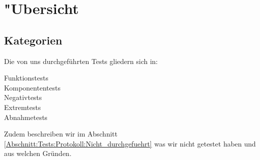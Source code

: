 %



\section{{"U}bersicht}
\label{Abschnitt:Tests:Uebersicht}

\subsection{Kategorien}
\label{Abschnitt:Tests:Uebersicht:Kategorien}

Die von uns durchgeführten Tests gliedern sich in:

\begin{description} %

	\item[Funktionstests]
	\item[Komponententests]
	\item[Negativtests]
	\item[Extremtests]
	\item[Abnahmetests]

\end{description}

Zudem beschreiben wir im Abschnitt \ref{Abschnitt:Tests:Protokoll:Nicht_durchgefuehrt} was wir nicht getestet haben und aus welchen Gründen.







